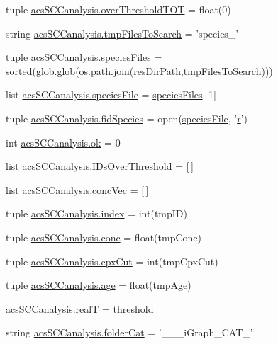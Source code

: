 \begin{DoxyCompactItemize}
\item 
tuple \hyperlink{a00130_a93de20dd9ebf791127ac5aefc0a2df8d}{acs\+S\+C\+Canalysis.\+over\+Threshold\+T\+O\+T} = float(0)
\item 
string \hyperlink{a00130_a141356fc914110fdf3ec4f0fc3beaab5}{acs\+S\+C\+Canalysis.\+tmp\+Files\+To\+Search} = 'species\+\_\+'
\item 
tuple \hyperlink{a00130_a4f47408478e9a0590d016df50cf42141}{acs\+S\+C\+Canalysis.\+species\+Files} = sorted(glob.\+glob(os.\+path.\+join(res\+Dir\+Path,tmp\+Files\+To\+Search)))
\item 
list \hyperlink{a00130_a1d066fa24dced2da12ffd9a8514a17ba}{acs\+S\+C\+Canalysis.\+species\+File} = \hyperlink{a00028_af5703745c2c2a6af7f62da460994d9c2}{species\+Files}\mbox{[}-\/1\mbox{]}
\item 
tuple \hyperlink{a00130_aba2f982879776e057b35971b3653549e}{acs\+S\+C\+Canalysis.\+fid\+Species} = open(\hyperlink{a00027_a7da0c82834970c5f3c3d9224ab832577}{species\+File}, '\hyperlink{a00031_ac862e7284527eb913b1351c8bfb8e079}{r}')
\item 
int \hyperlink{a00130_a9ce833d782f17d858941cfa76914599a}{acs\+S\+C\+Canalysis.\+ok} = 0
\item 
list \hyperlink{a00130_a578f0f0f1e87579d73b11f8720610b1e}{acs\+S\+C\+Canalysis.\+I\+Ds\+Over\+Threshold} = \mbox{[}$\,$\mbox{]}
\item 
list \hyperlink{a00130_a1681853ab5f5859e51f219caa07a8539}{acs\+S\+C\+Canalysis.\+conc\+Vec} = \mbox{[}$\,$\mbox{]}
\item 
tuple \hyperlink{a00130_aaac3bb67a998c4a09aeed8f1adec2f9c}{acs\+S\+C\+Canalysis.\+index} = int(tmp\+I\+D)
\item 
tuple \hyperlink{a00130_a6ec435b19c74f79f32a0eae7bb2bd1c8}{acs\+S\+C\+Canalysis.\+conc} = float(tmp\+Conc)
\item 
tuple \hyperlink{a00130_a06673ec4592e44a89a443073b8a29011}{acs\+S\+C\+Canalysis.\+cpx\+Cut} = int(tmp\+Cpx\+Cut)
\item 
tuple \hyperlink{a00130_a98baad82b74a27e8b8c58aa985b7d374}{acs\+S\+C\+Canalysis.\+age} = float(tmp\+Age)
\item 
\hyperlink{a00130_a1c9b45f6074222ace96b7ab38cb8e23b}{acs\+S\+C\+Canalysis.\+real\+T} = \hyperlink{a00036_aa022cbb28f80299d572def08e7a5ccfd}{threshold}
\item 
string \hyperlink{a00130_a1cbfd083273176eebfe0260e8384acef}{acs\+S\+C\+Canalysis.\+folder\+Cat} = '\+\_\+\+\_\+\_\+i\+Graph\+\_\+\+C\+A\+T\+\_\+'
\item 

\end{DoxyCompactItemize}
